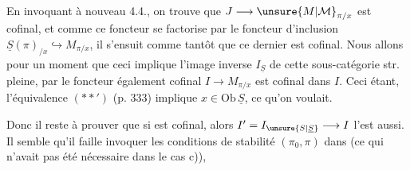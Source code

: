 
En invoquant à nouveau 4.4., on trouve que $J\longrightarrow\unsure{M|\mathcal M}_{\pi/x}$ est cofinal, et comme ce foncteur se factorise par le foncteur d'inclusion  $\underline S(\pi)_{/x}\hookrightarrow M_{\pi/x}$, il s'ensuit  comme tantôt que ce dernier est cofinal. Nous allons   pour un moment que ceci implique  l'image inverse $I_{\underline S}$ de cette sous-catégorie str. pleine, par le foncteur également cofinal $I\longrightarrow M_{\pi/x}$\unsure{;|,} est cofinal dans $I$. Ceci étant, l'équivalence $(**')$ (p. 333) implique $x\in\mathrm{Ob}\,\underline S$, ce qu'on voulait.

Donc il reste à prouver  que si
est cofinal, alors $I'=I_{\unsure{S|\underline S}}\longrightarrow I$ l'est aussi. Il semble qu'il faille    invoquer les conditions de stabilité  $(\pi_0,\pi)$  dans  (ce qui n'avait pas été nécessaire dans le cas c)), 


